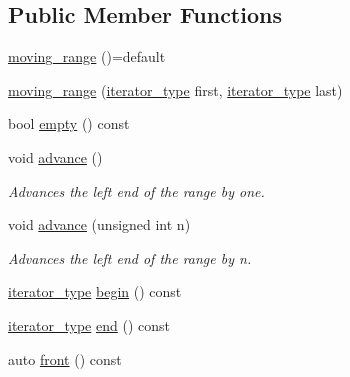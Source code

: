 \subsection*{Public Member Functions}
\begin{DoxyCompactItemize}
\item 
\mbox{\hyperlink{structirk_1_1moving__range_a20e176576675bfd01b511fb250df1e5f}{moving\+\_\+range}} ()=default
\item 
\mbox{\hyperlink{structirk_1_1moving__range_a4db0c17a812a7562a87e749b7313a0c9}{moving\+\_\+range}} (\mbox{\hyperlink{structirk_1_1moving__range_ad77e99c581516edfaae4cdb3cc6793ba}{iterator\+\_\+type}} first, \mbox{\hyperlink{structirk_1_1moving__range_ad77e99c581516edfaae4cdb3cc6793ba}{iterator\+\_\+type}} last)
\item 
bool \mbox{\hyperlink{structirk_1_1moving__range_ae3f8227591a53d22d087d8633ce3172f}{empty}} () const
\item 
void \mbox{\hyperlink{structirk_1_1moving__range_ae842c24ac2957ac1f68bd3d22e251e47}{advance}} ()
\begin{DoxyCompactList}\small\item\em Advances the left end of the range by one. \end{DoxyCompactList}\item 
void \mbox{\hyperlink{structirk_1_1moving__range_ab184b9ac91013a6de5b31abef0498371}{advance}} (unsigned int n)
\begin{DoxyCompactList}\small\item\em Advances the left end of the range by {\ttfamily n}. \end{DoxyCompactList}\item 
\mbox{\hyperlink{structirk_1_1moving__range_ad77e99c581516edfaae4cdb3cc6793ba}{iterator\+\_\+type}} \mbox{\hyperlink{structirk_1_1moving__range_ac24e6010803fdad694992f2a677dfdbb}{begin}} () const
\item 
\mbox{\hyperlink{structirk_1_1moving__range_ad77e99c581516edfaae4cdb3cc6793ba}{iterator\+\_\+type}} \mbox{\hyperlink{structirk_1_1moving__range_ad904d898c5132ebb7d6f479db591d093}{end}} () const
\item 
auto \mbox{\hyperlink{structirk_1_1moving__range_a10d1586db8a0f1cca48e27ca0cc4b2a9}{front}} () const
\end{DoxyCompactItemize}
